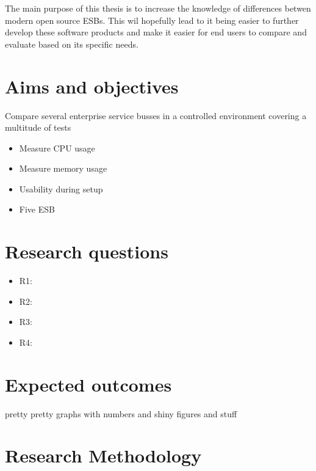 \documentclass[10pt,a4paper]{proposal}
\begin{document}
The main purpose of this thesis is to increase the knowledge of differences betwen modern open source ESBs. This wil hopefully lead to it being easier to further develop these software products and make it easier for end users to compare and evaluate based on its specific needs.


\section*{Aims and objectives}
Compare several enterprise service busses in a controlled environment covering a multitude of tests 

\begin{itemize}
	\item Measure CPU usage
	\item Measure memory usage
	\item Usability during setup
	\item  Five ESB
\end{itemize}


\section*{Research questions}
\begin{itemize}
	\item R1:
	\item R2:
	\item R3:
	\item R4:
\end{itemize}


\section*{Expected outcomes}
pretty pretty graphs with numbers and shiny figures and stuff


\section*{Research Methodology}
\end{document}
